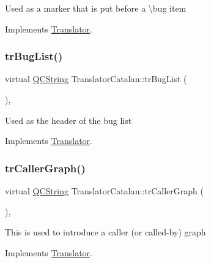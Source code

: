 Used as a marker that is put before a \textbackslash{}bug item 

Implements \mbox{\hyperlink{class_translator}{Translator}}.

\mbox{\label{class_translator_catalan_a89277562973819ab5d519ab82cd9816a}} 
\subsubsection{\texorpdfstring{trBugList()}{trBugList()}}
{\footnotesize\ttfamily virtual \mbox{\hyperlink{class_q_c_string}{Q\+C\+String}} Translator\+Catalan\+::tr\+Bug\+List (\begin{DoxyParamCaption}{ }\end{DoxyParamCaption})\hspace{0.3cm}{\ttfamily [inline]}, {\ttfamily [virtual]}}

Used as the header of the bug list 

Implements \mbox{\hyperlink{class_translator}{Translator}}.

\mbox{\label{class_translator_catalan_a48991359ea3f9cdc2bd22671714c7a65}} 
\subsubsection{\texorpdfstring{trCallerGraph()}{trCallerGraph()}}
{\footnotesize\ttfamily virtual \mbox{\hyperlink{class_q_c_string}{Q\+C\+String}} Translator\+Catalan\+::tr\+Caller\+Graph (\begin{DoxyParamCaption}{ }\end{DoxyParamCaption})\hspace{0.3cm}{\ttfamily [inline]}, {\ttfamily [virtual]}}

This is used to introduce a caller (or called-\/by) graph 

Implements \mbox{\hyperlink{class_translator}{Translator}}.

\mbox{\label{class_translator_catalan_a756bb5cc093b5b1786fc0f7bb82ad7d4}} 
